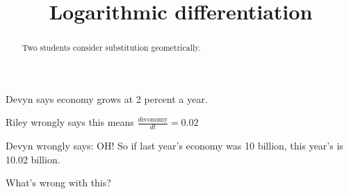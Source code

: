 \documentclass{ximera}
\title[Break-Ground:]{Logarithmic differentiation}
\begin{document}
\begin{abstract}
Two students consider substitution geometrically.
\end{abstract}
\maketitle

Devyn says economy grows at 2 percent a year.

Riley wrongly says this means $\frac{d\mbox{economy}}{dt} = 0.02$

Devyn wrongly says: OH!  So if last year's economy was 10 billion, this year's is 10.02 billion.

What's wrong with this?







\end{document}
